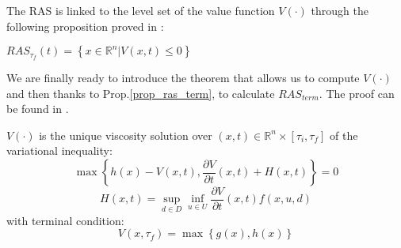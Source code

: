 The RAS is linked to the level set of the value function $V(\cdot)$ through the following proposition proved in \cite{reach_avoid_with_dist} :
\begin{prop}
    \label{prop_ras_term}
    $RAS_{\tau_f}(t) = \left\{x \in \mathbb{R}^n | V(x,t) \leq 0\right\}$
\end{prop}
We are finally ready to introduce the theorem that allows us to compute $V(\cdot)$ and then thanks to Prop.\ref{prop_ras_term}, to calculate $RAS_{term}$. The proof can be found in \cite{reach_avoid_with_dist}.
\begin{theorem}
    $V(\cdot)$ is the unique viscosity solution over $(x,t) \in \mathbb{R}^n \times [\tau_i, \tau_f]$ of the variational inequality:
    \[
        \max 
        \left\{
            h(x)-V(x,t), \frac{\partial V}{\partial t}(x,t)+H(x, t)
        \right\} = 0
    \]
    \[
        H(x, t) = \sup_{d \in D}\inf_{u \in U} \frac{\partial V}{\partial t}(x,t)f(x, u, d)
    \]
    with terminal condition:
    \[
        V(x,\tau_f)=\max\left\{g(x), h(x)\right\}
    \]
\end{theorem}

